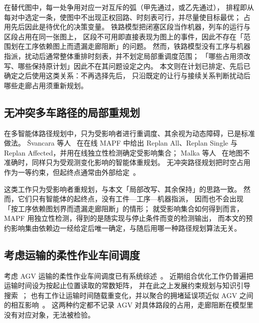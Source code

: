 \documentclass[manuscript,screen,review]{acmart}
\begin{document}
在替代图中，每一处争用对应一对互斥的弧（甲先通过，或乙先通过），
排程即从每对中选定一条，使图中不出现正权回路、时刻表可行，并尽量使目标最优；
占用先后因此是待优化的决策变量。
铁路模型把闭塞区段当作机器，列车的运行与区段占用在同一张图上，
区段不可用即直接表现为图上的事件，因此不存在「范围划在工序依赖图上而遗漏走廊阻断」的问题。
然而，铁路模型没有工序与机器指派，扰动后通常整体重排时刻表，并不划定局部重调度范围；
「哪些占用须改写、哪些保持原计划」因此不在其问题设定之内。
本文则在计划已排定、先后已确定之后使用这类关系：不再选择先后，
只沿既定的让行与接续关系判断扰动后哪些走廊占用须重新规划。

\subsection{无冲突多车路径的局部重规划}
\label{sec:rw_mapf}

在多智能体路径规划中，只为受影响者进行重调度、其余视为动态障碍，已是标准做法。
Švancara 等人~\cite{svancara2019online} 在在线 MAPF 中给出
Replan All、Replan Single 与 Replan Affected，并用在线独立性检测确定受影响集合；
Malka 等人~\cite{malka2024online} 在地图不准确时，同样只为受观测变化影响的智能体重规划。
无冲突路径规划把时空占用作为一等约束，但起终点通常由外部给定~\cite{zhang2024guidance}。

这类工作只为受影响者重规划，与本文「局部改写、其余保持」的思路一致。
然而，它们只有智能体的起终点，没有工件—工序—机器指派，
因而也不会出现「按工序依赖图划界而遗漏走廊阻断」的情形；
就受影响集合如何得到而言，MAPF 用独立性检测，得到的是随实现与停止条件而变的检测输出，
而本文的预约影响集由依赖边一经给定后唯一确定，与随后用哪一种路径规划算法无关。

\subsection{考虑运输的柔性作业车间调度}
\label{sec:rw_position}

考虑 AGV 运输的柔性作业车间调度已有系统综述~\cite{xin2025review}。
近期组合优化工作仍普遍把运输时间设为按起止位置读取的常数矩阵，
并在此之上发展约束规划与知识引导搜索~\cite{meng2025cp,qin2026knowledge}；
也有工作让运输时间随载重变化，并以聚合的拥堵延误项近似 AGV 之间的相互影响~\cite{jafarian2026integrated}。
这两种约定都不记录 AGV 对具体路段的占用，走廊阻断在模型里没有对应对象，无法被检验。
\end{document}
